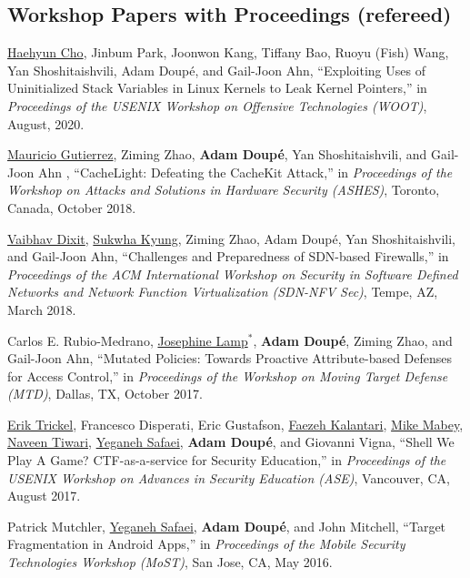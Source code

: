 \documentclass[11pt,letterpaper,sans]{moderncv}
\begin{document}
\subsection{Workshop Papers with Proceedings (refereed)}

\begin{etaremune}

\item \underline{Haehyun Cho}, Jinbum Park, Joonwon Kang, Tiffany Bao, Ruoyu (Fish) Wang, Yan Shoshitaishvili, Adam Doup\'e, and Gail-Joon Ahn, ``Exploiting Uses of Uninitialized Stack Variables in Linux Kernels to Leak Kernel Pointers,'' in \emph{Proceedings of the USENIX Workshop on Offensive Technologies (WOOT)}, August, 2020.

\item \underline{Mauricio Gutierrez}, Ziming Zhao, \textbf{Adam Doup\'e}, Yan Shoshitaishvili, and Gail-Joon Ahn , ``CacheLight: Defeating the CacheKit Attack,'' in \emph{Proceedings of the Workshop on Attacks and Solutions in Hardware Security (ASHES)}, Toronto, Canada, October 2018.

\item \underline{Vaibhav Dixit}, \underline{Sukwha Kyung}, Ziming
  Zhao, Adam Doupé, Yan Shoshitaishvili, and Gail-Joon Ahn,
  ``Challenges and Preparedness of SDN-based Firewalls,'' in
  \emph{Proceedings of the ACM International Workshop on Security in
    Software Defined Networks and Network Function Virtualization
    (SDN-NFV Sec)}, Tempe, AZ, March 2018. 

\item Carlos E. Rubio-Medrano, \underline{Josephine Lamp}$^*$, \textbf{Adam
  Doup\'e}, Ziming Zhao, and Gail-Joon Ahn, ``Mutated Policies: Towards
  Proactive Attribute-based Defenses for Access Control,'' in
  \emph{Proceedings of the Workshop on Moving Target Defense (MTD)},
  Dallas, TX, October 2017. 

\item \underline{Erik Trickel}, Francesco Disperati, Eric Gustafson,
  \underline{Faezeh Kalantari}, \underline{Mike Mabey},
  \underline{Naveen Tiwari}, \underline{Yeganeh Safaei}, \textbf{Adam
    Doup\'e}, and Giovanni Vigna, ``Shell We Play A Game?
  CTF-as-a-service for Security Education,'' in \emph{Proceedings of
    the USENIX Workshop on Advances in Security Education (ASE)},
  Vancouver, CA, August 2017.
      
\item Patrick Mutchler, \underline{Yeganeh Safaei}, \textbf{Adam
  Doup\'e}, and John Mitchell, ``Target Fragmentation in Android
  Apps,'' in \emph{Proceedings of the Mobile Security Technologies
    Workshop (MoST)}, San Jose, CA, May 2016.


\end{etaremune}
\end{document}
